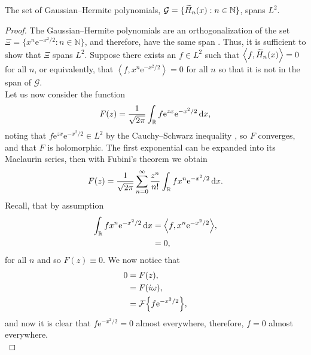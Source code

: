\begin{theorem}
\label{thm:hermite}
The set of Gaussian--Hermite polynomials, $\mathcal{G} = \{ \Her{n}{x} : n \in \mathbb{N} \}$, spans $L^2$.
\end{theorem}
\begin{proof}
The Gaussian--Hermite polynomials are an orthogonalization of the set $\Xi = \{x^n \textrm{e}^{-x^2/2} : n \in \mathbb{N}\}$, and therefore, have the same span \cite{kreyszig, szego}. Thus, it is sufficient to show that $\Xi$ spans $L^2$.
Suppose there exists an $f \in L^2$ such that $\left< f, \Her{n}{x} \right> = 0$ for all $n$, or equivalently, that $\left< f, x^n \textrm{e}^{-x^2/2} \right> = 0$ for all $n$ so that it is not in the span of $\mathcal{G}$. \\

Let us now consider the function \cite{courant, szego, teuwen}
\begin{align*}
F(z) = \frac{1}{\sqrt{2\pi}}\int_\mathbb{R} f \textrm{e}^{zx} \textrm{e}^{-x^2/2} \, \textrm{d} x,
\end{align*}
noting that $f \textrm{e}^{zx} \textrm{e}^{-x^2/2} \in L^2$ by the Cauchy--Schwarz inequality \cite{griffel, kolmogorov}, so $F$ converges, and that $F$ is holomorphic. The first exponential can be expanded into its Maclaurin series, then with Fubini's theorem we obtain
\begin{align*}
F(z) = \frac{1}{\sqrt{2\pi}} \sum_{n = 0}^{\infty} \frac{z^n}{n!} \int_\mathbb{R} f x^n \textrm{e}^{-x^2/2} \, \textrm{d} x.
\end{align*}
Recall, that by assumption
\begin{align*}
\int_\mathbb{R} f x^n \textrm{e}^{-x^2/2} \, \df x &= \left< f, x^n \textrm{e}^{-x^2/2} \right>, \\
&=0,
\end{align*}
for all $n$ and so $F(z) \equiv 0$. We now notice that
\begin{align*}
0 &= F(z), \\
&= F(i \omega), \\
&= \FT{f \textrm{e}^{-x^2/2}},
\end{align*}
and now it is clear that $f \textrm{e}^{-x^2/2} = 0$ almost everywhere, therefore, $f = 0$ almost everywhere. \\
\end{proof}


